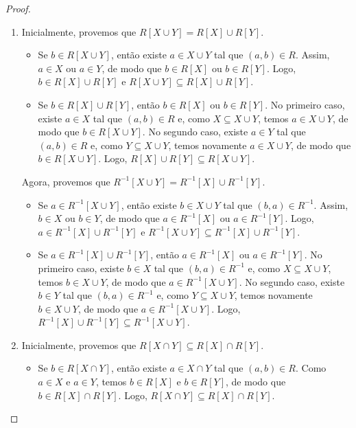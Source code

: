 \begin{proof}
\begin{enumerate}[leftmargin=*, align=left, label=\textbf{(\alph*)}]
\begin{enumerate}[label=\roman*.]
                    \item Inicialmente, provemos que $R[X \cup Y] = R[X] \cup R[Y]$.
                        \begin{itemize}
                            \item[($\subseteq$)] Se $b \in R[X \cup Y]$, então existe $a \in X \cup Y$ tal que $(a,b) \in R$. Assim, $a \in X$ ou $a \in Y$, de modo que $b \in R[X]$ ou $b \in R[Y]$. Logo, $b \in R[X] \cup R[Y]$ e $R[X \cup Y] \subseteq R[X] \cup R[Y]$.
                            \item[($\supseteq$)] Se $b \in R[X] \cup R[Y]$, então $b \in R[X]$ ou $b \in R[Y]$. No primeiro caso, existe $a \in X$ tal que $(a,b) \in R$ e, como $X \subseteq X \cup Y$, temos $a \in X \cup Y$, de modo que $b \in R[X \cup Y]$. No segundo caso, existe $a \in Y$ tal que $(a,b) \in R$ e, como $Y \subseteq X \cup Y$, temos novamente $a \in X \cup Y$, de modo que $b \in R[X \cup Y]$. Logo, $R[X] \cup R[Y] \subseteq R[X \cup Y]$.
                        \end{itemize}
                    Agora, provemos que $R^{-1}[X \cup Y] = R^{-1}[X] \cup R^{-1}[Y]$.
                        \begin{itemize}
                            \item[($\subseteq$)] Se $a \in R^{-1}[X \cup Y]$, então existe $b \in X \cup Y$ tal que $(b,a) \in R^{-1}$. Assim, $b \in X$ ou $b \in Y$, de modo que $a \in R^{-1}[X]$ ou $a \in R^{-1}[Y]$. Logo, $a \in R^{-1}[X] \cup R^{-1}[Y]$ e $R^{-1}[X \cup Y] \subseteq R^{-1}[X] \cup R^{-1}[Y]$.
                            \item[($\supseteq$)] Se $a \in R^{-1}[X] \cup R^{-1}[Y]$, então $a \in R^{-1}[X]$ ou $a \in R^{-1}[Y]$. No primeiro caso, existe $b \in X$ tal que $(b,a) \in R^{-1}$ e, como $X \subseteq X \cup Y$, temos $b \in X \cup Y$, de modo que $a \in R^{-1}[X \cup Y]$. No segundo caso, existe $b \in Y$ tal que $(b,a) \in R^{-1}$ e, como $Y \subseteq X \cup Y$, temos novamente $b \in X \cup Y$, de modo que $a \in R^{-1}[X \cup Y]$. Logo, $R^{-1}[X] \cup R^{-1}[Y] \subseteq R^{-1}[X \cup Y]$.
                        \end{itemize}
                    \item Inicialmente, provemos que $R[X \cap Y] \subseteq R[X] \cap R[Y]$.
                        \begin{itemize}
                            \item[($\subseteq$)] Se $b \in R[X \cap Y]$, então existe $a \in X \cap Y$ tal que $(a,b) \in R$. Como $a \in X$ e $a \in Y$, temos $b \in R[X]$ e $b \in R[Y]$, de modo que $b \in R[X] \cap R[Y]$. Logo, $R[X \cap Y] \subseteq R[X] \cap R[Y]$.

\end{itemize}
\end{enumerate}
\end{enumerate}
\end{proof}
